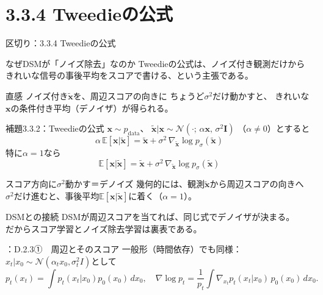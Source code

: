 \section{3.3.4 Tweedieの公式}
\asmain
\begin{frame}{区切り：3.3.4 Tweedieの公式}
    \tableofcontents[currentsection]
\end{frame}
\asmain
\begin{frame}{なぜDSMが「ノイズ除去」なのか}
    Tweedieの公式は、ノイズ付き観測だけから
    きれいな信号の事後平均をスコアで書ける、という主張である。
    \begin{block}{直感}
        ノイズ付き$\tilde{\bm{x}}$を、周辺スコアの向きに
        ちょうど$\sigma^{2}$だけ動かすと、
        きれいな$\bm{x}$の条件付き平均（デノイザ）が得られる。
    \end{block}
\end{frame}
\asmain
\begin{frame}{補題3.3.2：Tweedieの公式}
    $\bm{x}\sim p_{\mathrm{data}}$、
    $\tilde{\bm{x}}|\bm{x}\sim\mathcal{N}(\cdot;\,\alpha\bm{x},\,\sigma^{2}\bm{I})$
    （$\alpha\neq 0$）とすると
    \[
        \alpha\,\mathbb{E}[\bm{x}|\tilde{\bm{x}}]
        =
        \tilde{\bm{x}}
        +
        \sigma^{2}\,
        \nabla_{\tilde{\bm{x}}}\log p_{\sigma}(\tilde{\bm{x}})
        \tag{3.3.6}
    \]
    特に$\alpha=1$なら
    \[
        \mathbb{E}[\bm{x}|\tilde{\bm{x}}]
        =
        \tilde{\bm{x}}
        +
        \sigma^{2}\,
        \nabla_{\tilde{\bm{x}}}\log p_{\sigma}(\tilde{\bm{x}})
    \]
\end{frame}
\assuppl
\begin{frame}{スコア方向に$\sigma^{2}$動かす＝デノイズ}
    幾何的には、観測$\tilde{\bm{x}}$から周辺スコアの向きへ
    $\sigma^{2}$だけ進むと、事後平均$\mathbb{E}[\bm{x}|\tilde{\bm{x}}]$に着く（$\alpha=1$）。
    \begin{exampleblock}{DSMとの接続}
        DSMが周辺スコアを当てれば、同じ式でデノイザが決まる。\\
        だからスコア学習とノイズ除去学習は裏表である。
    \end{exampleblock}
\end{frame}
\assuppl
\begin{frame}{\supplmark：D.2.3①　周辺とそのスコア}
    一般形（時間依存）でも同様：
    $x_t|x_0\sim\mathcal{N}(\alpha_t x_0,\sigma_t^{2}I)$として
    \[
        p_t(x_t)=\int p_t(x_t|x_0)p_0(x_0)\,dx_0,
        \quad
        \nabla\log p_t
        =
        \frac{1}{p_t}
        \int
        \nabla_{x_t}p_t(x_t|x_0)\,p_0(x_0)\,dx_0.
    \]
\end{frame}
